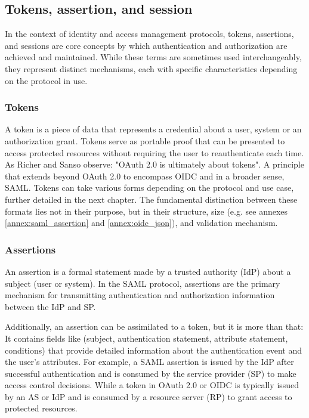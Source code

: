 \documentclass[../memoire.tex]{subfiles}
\begin{document}
\subsection{Tokens, assertion, and session} \label{sous_sec_deux}

In the context of identity and access management protocols, tokens, assertions, and sessions are core concepts by which authentication and authorization are achieved and maintained. While these terms are sometimes used interchangeably, they represent distinct mechanisms, each with specific characteristics depending on the protocol in use.

\subsubsection{Tokens}

A token is a piece of data that represents a credential about a user, system or an authorization grant. Tokens serve as portable proof that can be presented to access protected resources without requiring the user to reauthenticate each time. As Richer and Sanso observe: "OAuth 2.0 is ultimately about tokens"\cite[p.~181]{richer2017}. A principle that extends beyond OAuth 2.0 to encompass OIDC and in a broader sense, SAML. 
Tokens can take various forms depending on the protocol and use case, further detailed in the next chapter. The fundamental distinction between these formats lies not in their purpose, but in their structure, size (e.g. see annexes \ref{annex:saml_assertion} and \ref{annex:oidc_json}), and validation mechanism. 

\subsubsection{Assertions}

An assertion is a formal statement made by a trusted authority (IdP) about a subject (user or system). In the SAML protocol, assertions are the primary mechanism for transmitting authentication and authorization information between the IdP and SP.

 Additionally, an assertion can be assimilated to a token, but it is more than that: It contains fields like (subject, authentication statement, attribute statement, conditions) that provide detailed information about the authentication event and the user's attributes. For example, a SAML assertion is issued by the IdP after successful authentication and is consumed by the service provider (SP) to make access control decisions. While a token in OAuth 2.0 or OIDC is typically issued by an AS or IdP and is consumed by a resource server (RP) to grant access to protected resources.
\end{document}
